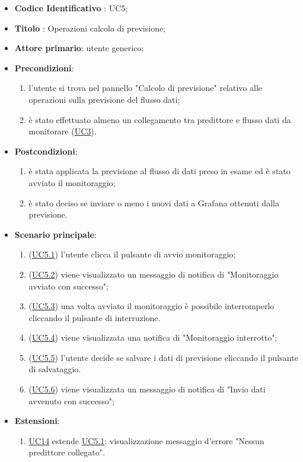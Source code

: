 		\begin{itemize}
			\item\textbf{Codice Identificativo} : UC5;
			\item\textbf{Titolo} : Operazioni calcolo di previsione;
			\item\textbf{Attore primario}: utente generico;
			\item\textbf{Precondizioni}:
				\begin{enumerate}
					\item l'utente si trova nel pannello "Calcolo di previsione" relativo alle operazioni sulla previsione del flusso dati;
					\item è stato effettuato almeno un collegamento tra predittore e flusso dati da monitorare (\hyperref[par:UC3]{UC3}).
				\end{enumerate}		
	\item\textbf{Postcondizioni}:
				\begin{enumerate}
					\item è stata applicata la previsione al flusso di dati preso in esame ed è stato avviato il monitoraggio;
					\item è stato deciso se inviare o meno i nuovi dati a Grafana ottenuti dalla previsione.
				\end{enumerate}
			\item\textbf{Scenario principale}:
				\begin{enumerate}
					\item (\hyperref[par:UC5.1]{UC5.1}) l'utente clicca il pulsante di avvio monitoraggio;
					\item (\hyperref[par:UC5.2]{UC5.2}) viene visualizzato un messaggio di notifica di "Monitoraggio avviato con successo";
					\item (\hyperref[par:UC5.3]{UC5.3}) una volta avviato il monitoraggio è possibile interromperlo cliccando il pulsante di interruzione.
					\item (\hyperref[par:UC5.4]{UC5.4}) viene visualizzata una notifica di "Monitoraggio interrotto";		
					\item (\hyperref[par:UC5.5]{UC5.5}) l'utente decide se salvare i dati di previsione cliccando il pulsante di salvataggio.
					\item (\hyperref[par:UC5.6]{UC5.6}) viene visualizzata un messaggio di notifica di "Invio dati avvenuto con successo";
				\end{enumerate}
			\item\textbf{Estensioni}:
				\begin{enumerate}
					\item \hyperref[par:UC14]{UC14} estende \hyperref[par:UC5.1]{UC5.1}: visualizzazione messaggio d'errore "Nessun predittore collegato".

				\end{enumerate}
		\end{itemize}

